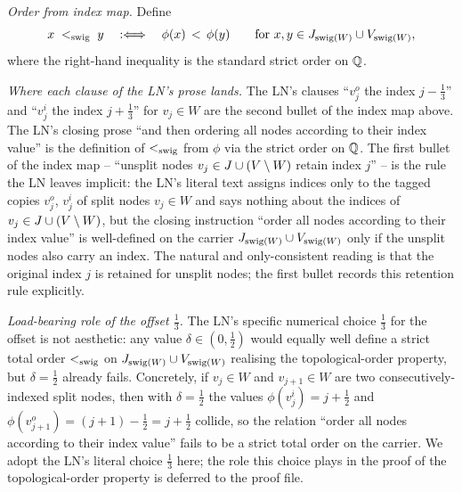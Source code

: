 \documentclass[main]{subfiles}
\begin{document}
\begin{Rem}[SwigAcyclic]
\begin{enumerate}[label=(\alph*)]
              \emph{Order from index map.}
              Define
              \[
                  x \;<_{\mathrm{swig}}\; y \quad :\Longleftrightarrow\quad \phi(x) \,<\, \phi(y) \qquad \text{for } x, y \in J_{\mathrm{swig}(W)} \cup V_{\mathrm{swig}(W)},
              \]
              where the right-hand inequality is the standard strict order on $\mathbb{Q}$.
    \end{enumerate}

    \emph{Where each clause of the LN's prose lands.}
    The LN's clauses ``$v_j^o$ the index $j - \tfrac{1}{3}$'' and ``$v_j^i$ the index $j + \tfrac{1}{3}$'' for $v_j \in W$ are the second bullet of the index map above. The LN's closing prose ``and then ordering all nodes according to their index value'' is the definition of $<_{\mathrm{swig}}$ from $\phi$ via the strict order on $\mathbb{Q}$. The first bullet of the index map -- ``unsplit nodes $v_j \in J \cup (V \setminus W)$ retain index $j$'' -- is the rule the LN leaves implicit: the LN's literal text assigns indices only to the tagged copies $v_j^o$, $v_j^i$ of split nodes $v_j \in W$ and says nothing about the indices of $v_j \in J \cup (V \setminus W)$, but the closing instruction ``order all nodes according to their index value'' is well-defined on the carrier $J_{\mathrm{swig}(W)} \cup V_{\mathrm{swig}(W)}$ only if the unsplit nodes also carry an index. The natural and only-consistent reading is that the original index $j$ is retained for unsplit nodes; the first bullet records this retention rule explicitly.

    \emph{Load-bearing role of the offset $\tfrac{1}{3}$.}
    The LN's specific numerical choice $\tfrac{1}{3}$ for the offset is not aesthetic: any value $\delta \in (0, \tfrac{1}{2})$ would equally well define a strict total order $<_{\mathrm{swig}}$ on $J_{\mathrm{swig}(W)} \cup V_{\mathrm{swig}(W)}$ realising the topological-order property, but $\delta = \tfrac{1}{2}$ already fails. Concretely, if $v_j \in W$ and $v_{j+1} \in W$ are two consecutively-indexed split nodes, then with $\delta = \tfrac{1}{2}$ the values $\phi(v_j^i) = j + \tfrac{1}{2}$ and $\phi(v_{j+1}^o) = (j+1) - \tfrac{1}{2} = j + \tfrac{1}{2}$ collide, so the relation ``order all nodes according to their index value'' fails to be a strict total order on the carrier. We adopt the LN's literal choice $\tfrac{1}{3}$ here; the role this choice plays in the proof of the topological-order property is deferred to the proof file.


\end{Rem}
\end{document}
